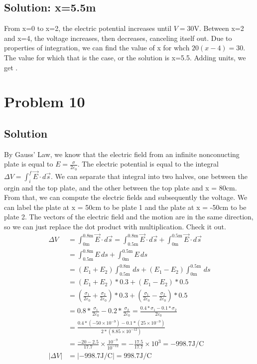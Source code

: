 \documentclass[12pt]{article}
\begin{document}
\subsection{Solution: x=5.5m}
From x=0 to x=2, the electric potential increases until $V = 30\unit\volt$. 
Between x=2 and x=4, the voltage increases, then decreases, canceling itself out. 
Due to properties of integration, we can find the value of x for whch $20(x - 4) = 30$. 
The value for which that is the case, or the solution is x=5.5.
Adding units, we get .  

\section{Problem 10}
\subsection*{Solution}
By Gauss' Law, we know that the electric field from an infinite nonconucting plate is equal to $E = \frac{\sigma}{2\varepsilon_0}$.
The electric potential is equal to the integral $\Delta V = \int_{i}^{f} \vec{E}\cdot d\vec{s}$.
We can separate that integral into two halves, one between the orgin and the top plate, and the other between the top plate and x = 80cm.
From that, we can compute the electric fields and subsequently the voltage.
We can label the plate at x = 50cm to be plate 1 and the plate at x = -50cm to be plate 2.
The vectors of the electric field and the motion are in the same direction, so we can just replace the dot product with multiplication.
Check it out.
\begin{align*}
    \Delta V    &=  \int_{0\unit{\meter}}^{0.8\unit{\meter}} \vec{E} \cdot d\vec{s}
        =   \int_{0.5\unit{\meter}}^{0.8\unit{\meter}} \vec{E} \cdot d\vec{s} + \int_{0\unit{\meter}}^{0.5\unit{\meter}} \vec{E} \cdot d\vec{s}\\
        &=  \int_{0.5\unit{\meter}}^{0.8\unit{\meter}} E \,ds + \int_{0\unit{\meter}}^{0.5\unit{\meter}} E \,ds\\
        &=  (E_1 + E_2) \int_{0.5\unit{\meter}}^{0.8\unit{\meter}} \,ds + (E_1 - E_2) \int_{0\unit{\meter}}^{0.5\unit{\meter}} \,ds\\
        &=  (E_1 + E_2)*0.3 + (E_1 - E_2)*0.5\\
        &=  \left(\frac{\sigma_1}{2\varepsilon_0} + \frac{\sigma_2}{2\varepsilon_0}\right)*0.3 + \left(\frac{\sigma_1}{2\varepsilon_0} - \frac{\sigma_2}{2\varepsilon_0}\right)*0.5\\
        &=  0.8*\frac{\sigma_1}{2\varepsilon_0} - 0.2*\frac{\sigma_2}{2\varepsilon_0}
        =   \frac{0.4*\sigma_1 - 0.1*\sigma_2}{2\varepsilon_0}\\
        &=  \frac{0.4*(-50 \times 10^{-9}) - 0.1*(25 \times 10^{-9})}{2*(8.85 \times 10^{-12})}\\
        &=  \frac{-20 - 2.5}{17.7} \times \frac{10^{-9}}{10^{-12}}
        =   -\frac{17.5}{17.7} \times 10^3
        =   -998.7 \unit{\joule/\coulomb}\\
    \left|\Delta V\right|   &=  \left|-998.7 \unit{\joule/\coulomb}\right|
        =   \boxed{998.7 \unit{\joule/\coulomb}}
\end{align*}
\end{document}
